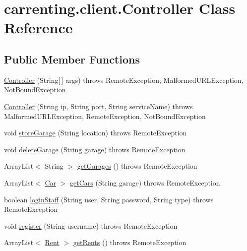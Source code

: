 \hypertarget{classcarrenting_1_1client_1_1_controller}{}\section{carrenting.\+client.\+Controller Class Reference}
\label{classcarrenting_1_1client_1_1_controller}
\subsection*{Public Member Functions}
\begin{DoxyCompactItemize}
\item 
\mbox{\hyperlink{classcarrenting_1_1client_1_1_controller_a54c511ae5355b24a7215c181cefb1846}{Controller}} (String\mbox{[}$\,$\mbox{]} args)  throws Remote\+Exception, Malformed\+U\+R\+L\+Exception, Not\+Bound\+Exception
\item 
\mbox{\hyperlink{classcarrenting_1_1client_1_1_controller_aa2cbbf30110eecbf9cb7dd0a57cc8a4c}{Controller}} (String ip, String port, String service\+Name)  throws Malformed\+U\+R\+L\+Exception, Remote\+Exception, Not\+Bound\+Exception 
\item 
void \mbox{\hyperlink{classcarrenting_1_1client_1_1_controller_ab6ddf6da22a98db5fe72e2c4b19c70d0}{store\+Garage}} (String location)  throws Remote\+Exception 
\item 
void \mbox{\hyperlink{classcarrenting_1_1client_1_1_controller_a41f7110cdb9a72be3de30b5ddd7ac8e3}{delete\+Garage}} (String garage)  throws Remote\+Exception 
\item 
Array\+List$<$ String $>$ \mbox{\hyperlink{classcarrenting_1_1client_1_1_controller_a38355c55fd14b445cbc7e420a5c36fa7}{get\+Garages}} ()  throws Remote\+Exception
\item 
Array\+List$<$ \mbox{\hyperlink{classcarrenting_1_1server_1_1jdo_1_1_car}{Car}} $>$ \mbox{\hyperlink{classcarrenting_1_1client_1_1_controller_a1e9a90a7164b6a988e23d77ecf39eea9}{get\+Cars}} (String garage)  throws Remote\+Exception
\item 
boolean \mbox{\hyperlink{classcarrenting_1_1client_1_1_controller_ae1141f30035d8d32ec22db92b3710f8c}{login\+Staff}} (String user, String password, String type)  throws Remote\+Exception 
\item 
void \mbox{\hyperlink{classcarrenting_1_1client_1_1_controller_a642d9b66b13dcba6c1843c0bee2f060e}{register}} (String username)  throws Remote\+Exception 
\item 
Array\+List$<$ \mbox{\hyperlink{classcarrenting_1_1server_1_1jdo_1_1_rent}{Rent}} $>$ \mbox{\hyperlink{classcarrenting_1_1client_1_1_controller_a4ba12c757900989ed2755f9924410a4b}{get\+Rents}} ()  throws Remote\+Exception 

\end{DoxyCompactItemize}
